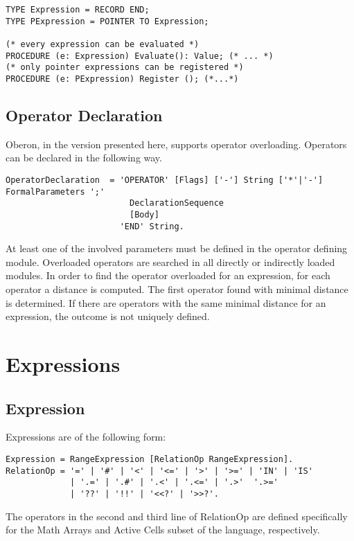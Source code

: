 \documentclass[a4wide,11pt]{article}
\begin{document}
\begin{annotation}
\begin{lstlisting}[style=example]
TYPE Expression = RECORD END;
TYPE PExpression = POINTER TO Expression;

(* every expression can be evaluated *)
PROCEDURE (e: Expression) Evaluate(): Value; (* ... *)
(* only pointer expressions can be registered *)
PROCEDURE (e: PExpression) Register (); (*...*)
\end{lstlisting}


\end{annotation}
\subsection{Operator Declaration}\label{subsection: Operator Declaration}

Oberon, in the version presented here, supports operator overloading. Operators can be declared in the following way.

\begin{lstlisting}[style=ebnf]
OperatorDeclaration  = 'OPERATOR' [Flags] ['-'] String ['*'|'-'] FormalParameters ';'
                         DeclarationSequence
                         [Body]
                       'END' String.
\end{lstlisting}

At least one of the involved parameters must be defined in the operator defining module.
Overloaded operators are searched in all directly or indirectly loaded modules.
In order to find the operator overloaded for an expression, for each operator a distance is computed.
The first operator found with minimal distance is determined.
If there are operators with the same minimal distance for an expression, the outcome is not uniquely defined.

\section{Expressions}

\subsection{Expression}

Expressions are of the following form:
\begin{lstlisting}[style=ebnf]
Expression = RangeExpression [RelationOp RangeExpression].
RelationOp = '=' | '#' | '<' | '<=' | '>' | '>=' | 'IN' | 'IS'
             | '.=' | '.#' | '.<' | '.<=' | '.>'  '.>='
             | '??' | '!!' | '<<?' | '>>?'.
\end{lstlisting}
The operators in the second and third line of RelationOp are defined specifically for the Math Arrays and Active Cells subset of the language, respectively.
\end{document}
